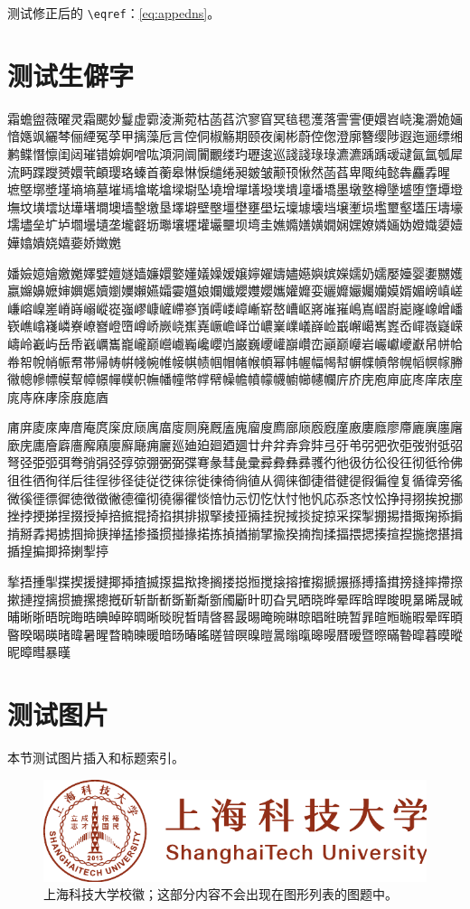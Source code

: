 \documentclass[
  fontset = mac,
]{shtthesis}
\begin{document}
测试修正后的 \verb|\eqref|：\eqref{eq:appedns}。

\section{测试生僻字}
{\songti 霜蟾盥薇曜灵霜颸妙鬘虚霩淩澌菀枯菡萏泬寥窅冥毰毸濩落霅霅便嬛岧峣瀺灂姽婳愔嫕飒纚棽俪緸冤莩甲摛藻卮言倥侗椒觞期颐夜阑彬蔚倥偬澄廓簪缨陟遐迤逦缥缃鹣鲽憯懔闺闼璀错媕婀噌吰澒洞阛闠覼缕玓瓑逡巡諓諓琭琭瀌瀌踽踽叆叇氤氲瓠犀流眄蹀躞赟嬛茕頔璎珞螓首蘅皋惏悷缱绻昶皴皱颟顸愀然菡萏卑陬纯懿犇麤掱暒 墌墍墎墏墐墒墒墓墔墕墖墘墖墚墛坠墝增墠墡墢墣墤墥墦墧墨墩墪樽墬墭堕墯墰墱墲坟墴墵垯墷墸墹墺墙墼墽垦墿壀壁壂壃壄壅壆坛壈壉壊垱壌壍埙壏壐壑壒压壔壕壖壗垒圹垆壛壜壝垄壠壡坜壣壤壥壦壧壨坝塆圭嫶嫷嫸嫹嫺娴嫼嫽嫾婳妫嬁嬂嬃嬄嬅嬆嬇娆嬉嬊娇嬍嬎}

{\heiti 嬏嬐嬑嬒嬓嬔嬕嬖嬗嬘嫱嬚嬛嬜嬞嬟嬠嫒嬢嬣嬥嬦嬧嬨嬩嫔嬫嬬奶嬬嬮嬯婴嬱嬲嬳嬴嬵嬶嬷婶嬹嬺嬻嬼嬽嬾嬿孀孁孂娘孄孅孆孇孆孈孉孊娈孋孊孍孎孏嫫婿媚嵭嵮嵯嵰嵱嵲嵳嵴嵵嵶嵷嵸嵹嵺嵻嵼嵽嵾嵿嶀嵝嶂嶃崭嶅嶆岖嶈嶉嶊嶋嶌嶍嶎嶏嶐嶑嶒嶓嵚嶕嶖嶘嶙嶚嶛嶜嶝嶞嶟峤嶡峣嶣嶤嶥嶦峄峃嶩嶪嶫嶬嶭崄嶯嶰嶱嶲嶳岙嶵嶶嶷嵘嶹岭嶻屿岳帋巀巁巂巃巄巅巆巇巈巉巊岿巌巍巎巏巐巑峦巓巅巕岩巗巘巙巚帠帡帢帣帤帨帩帪帬帯帰帱帲帴帵帷帹帺帻帼帽帾帿幁幂帏幄幅幆幇幈幉幊幋幌幍幎幏幐幑幒幓幖幙幚幛幜幝幞帜幠幡幢幤幥幦幧幨幩幪幭幮幯幰幱庍庎庑庖庘庛庝庠庡庢庣庤庥庨庩庪庬庮}

{\kaishu 庯庰庱庲庳庴庵庹庺庻庼庽庿廀厕廃厩廅廆廇廋廌廍庼廏廐廑廒廔廕廖廗廘廙廛廜廞庑廤廥廦廧廨廭廮廯廰痈廲廵廸廹廻廼廽廿弁弅弆弇弉弖弙弚弜弝弞弡弢弣弤弨弩弪弫弬弭弮弰弲弪弴弶弸弻弼弽弿彖彗彘彚彛彜彝彞彟彴彵彶彷彸役彺彻彽彾佛徂徃徆徇徉后徍徎徏径徒従徔徕徖徙徚徛徜徝从徟徕御徢徣徤徥徦徧徨复循徫旁徭微徯徰徱徲徳徴徵徶德徸彻徺忁忂惔愔忇忈忉忔忕忖忚忛応忝忞忟忪挣挦挧挨挩挪挫挬挭挮挰掇授掉掊掋掍掎掐掑排掓掔掕挜掚挂掜掝掞掟掠采探掣掤掦措掫掬掭掮掯掰掱掲掳掴掵掶掸掹掺掻掼掽掾掿拣揁揂揃揅揄揆揇揈揉揊揋揌揍揎揑揓揔揕揖揗揘揙揤揥揦揧揨}

{\fangsong 揫捂揰揱揲揳援揵揶揷揸揻揼揾揿搀搁搂搃搄搅搇搈搉搊搋搌搎搏搐搑搒摓摔摕摖摗摙摚摛掼摝摞摠摡斫斩斮斱斲斳斴斵斶斸旪旫旮旯晒晓晔晕晖晗晘晙晛晜晞晟晠晡晰晣晤晥晦晧晪晫晬晭晰晱晲晳晴晵晷晸晹晻晼晽晾晿暀暁暂暃暄暅暆暇晕晖暊暋暌暍暎暏暐暑暒暓暔暕暖暗旸暙暚暛暜暝暞暟暠暡暣暤暥暦暧暨暩暪暬暭暮暯暰昵暲暳暴暵}

\section{测试图片}
本节测试图片插入和标题索引。

\begin{figure}[htb]
  \centering
  \includegraphics[width=0.75\columnwidth]{shanghaitech-logo.pdf}
  \caption[上海科技大学校徽]{上海科技大学校徽；这部分内容不会出现在图形列表的图题中。}
\end{figure}
\end{document}
